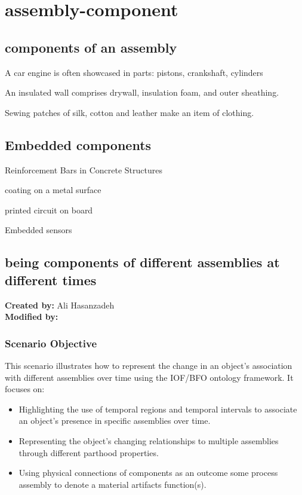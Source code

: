 \chapter{assembly-component}

\section{components of an assembly}

A car engine is often showcased in parts: pistons, crankshaft, cylinders

An insulated wall comprises drywall, insulation foam, and outer sheathing.

Sewing patches of silk, cotton and leather make an item of clothing.

\section{Embedded components}

Reinforcement Bars in Concrete Structures

coating on a metal surface

printed circuit on board

Embedded sensors

\section{being components of different assemblies at different times}

\textbf{Created by:} Ali Hasanzadeh \\
\textbf{Modified by:}  \\

\subsection*{Scenario Objective}

This scenario illustrates how to represent the change in an object's association with different assemblies over time using the IOF/BFO ontology framework. It focuses on:
\begin{itemize}
    \item Highlighting the use of temporal regions and temporal intervals to associate an object's presence in specific assemblies over time.
    \item Representing the object's changing relationships to multiple assemblies through different parthood properties.
    \item Using physical connections of components as an outcome some process assembly to denote a material artifacts function(s). 
\end{itemize}

